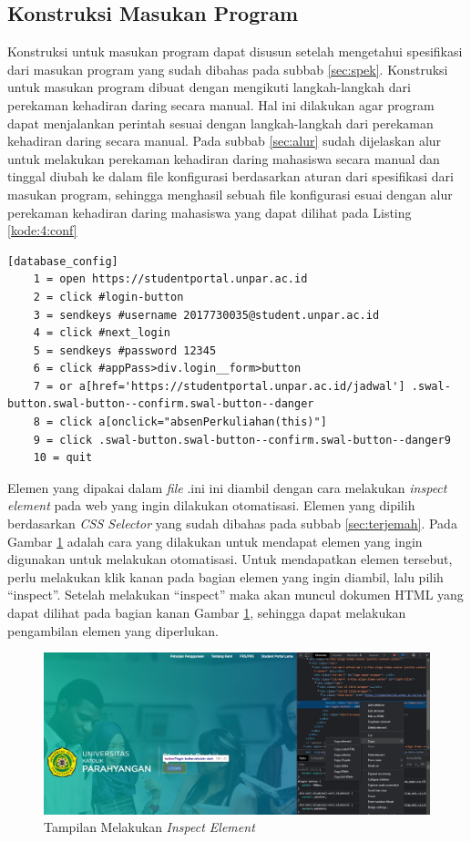 \subsection{Konstruksi Masukan Program}
Konstruksi untuk masukan program dapat disusun setelah mengetahui spesifikasi dari masukan program yang sudah dibahas pada subbab \ref{sec:spek}. Konstruksi untuk masukan program dibuat dengan mengikuti langkah-langkah dari perekaman kehadiran daring secara manual. Hal ini dilakukan agar program dapat menjalankan perintah sesuai dengan langkah-langkah dari perekaman kehadiran daring secara manual. Pada subbab \ref{sec:alur} sudah dijelaskan alur untuk melakukan perekaman kehadiran daring mahasiswa secara manual dan tinggal diubah ke dalam file konfigurasi berdasarkan aturan dari spesifikasi dari masukan program, sehingga menghasil sebuah file konfigurasi esuai dengan alur perekaman kehadiran daring mahasiswa yang dapat dilihat pada Listing \ref{kode:4:conf}
\begin{lstlisting}[caption=Contoh \textit{file} .ini untuk Masukan Perangkat Lunak Perekaman Kehadiran Daring Otomatis, label=kode:4:conf]
	[database_config]
	1 = open https://studentportal.unpar.ac.id
	2 = click #login-button
	3 = sendkeys #username 2017730035@student.unpar.ac.id 
	4 = click #next_login
	5 = sendkeys #password 12345
	6 = click #appPass>div.login__form>button
	7 = or a[href='https://studentportal.unpar.ac.id/jadwal'] .swal-button.swal-button--confirm.swal-button--danger
	8 = click a[onclick="absenPerkuliahan(this)"]
	9 = click .swal-button.swal-button--confirm.swal-button--danger9
	10 = quit
\end{lstlisting}
Elemen yang dipakai dalam \textit{file} .ini ini diambil dengan cara melakukan \textit{inspect element} pada web yang ingin dilakukan otomatisasi. Elemen yang dipilih berdasarkan \textit{CSS Selector} yang sudah dibahas pada subbab \ref{sec:terjemah}. Pada Gambar \ref{fig:inspect} adalah cara yang dilakukan untuk mendapat elemen yang ingin digunakan untuk melakukan otomatisasi. Untuk mendapatkan elemen tersebut, perlu melakukan klik kanan pada bagian elemen yang ingin diambil, lalu pilih ``inspect''. Setelah melakukan ``inspect'' maka akan muncul dokumen HTML yang dapat dilihat pada bagian kanan Gambar \ref{fig:inspect}, sehingga dapat melakukan pengambilan elemen yang diperlukan.
\begin{figure}[H]
	\centering
	\includegraphics[scale=0.3]{Gambar/elemen.jpg}
	\caption{Tampilan Melakukan \textit{Inspect Element}} 
	\label{fig:inspect}
\end{figure}	

